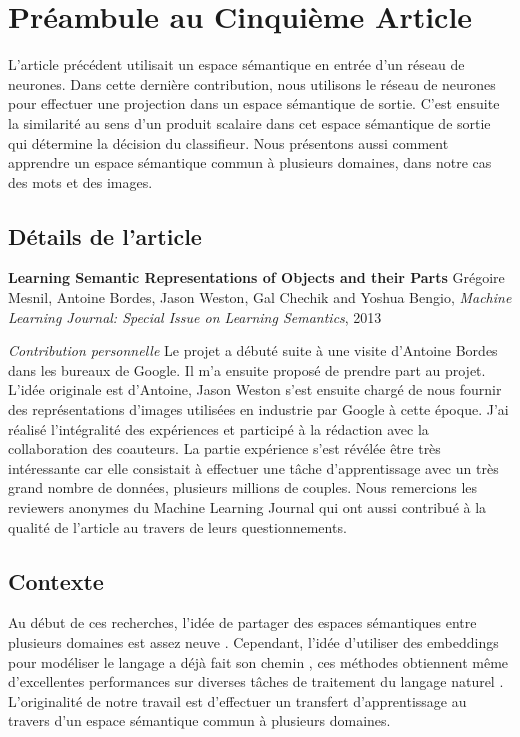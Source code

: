 \chapter{Pr\'{e}ambule au Cinqui\`{e}me Article }

L'article précédent utilisait un espace sémantique en entrée d'un réseau de
neurones. Dans cette dernière contribution, nous utilisons le réseau de
neurones pour effectuer une projection dans un espace sémantique de sortie.
C'est ensuite la similarité au sens d'un produit scalaire dans cet espace
sémantique de sortie qui détermine la décision du classifieur. Nous présentons
aussi comment apprendre un espace sémantique commun à plusieurs domaines, dans
notre cas des mots et des images.

\section{D\'{e}tails de l'article}

{\bf Learning Semantic Representations of Objects and their Parts} Grégoire
Mesnil, Antoine Bordes, Jason Weston, Gal Chechik and Yoshua Bengio, {\it
Machine Learning Journal: Special Issue on Learning Semantics}, 2013

{\it Contribution personnelle} Le projet a débuté suite à une visite d'Antoine
Bordes dans les bureaux de Google. Il m'a ensuite proposé de prendre part au
projet. L'idée originale est d'Antoine, Jason Weston s'est ensuite chargé de
nous fournir des représentations d'images utilisées en industrie par Google à
cette époque. J'ai réalisé l'intégralité des expériences et participé à la
rédaction avec la collaboration des coauteurs. La partie expérience s'est
révélée être très intéressante car elle consistait à effectuer une tâche
d'apprentissage avec un très grand nombre de données, plusieurs millions de
couples.  Nous remercions les reviewers anonymes du Machine Learning Journal
qui ont aussi contribué à la qualité de l'article au travers de leurs
questionnements.

\section{Contexte}

Au début de ces recherches, l'idée de partager des espaces sémantiques entre
plusieurs domaines est assez neuve \citep{image-wsabie}. Cependant, l'idée
d'utiliser des embeddings pour modéliser le langage a déjà fait son chemin
\citep{bengio:2003}, ces méthodes obtiennent même d'excellentes performances
sur diverses tâches de traitement du langage naturel \citep{collobert:2011b}.
L'originalité de notre travail est d'effectuer un transfert d'apprentissage au
travers d'un espace sémantique commun à plusieurs domaines.

